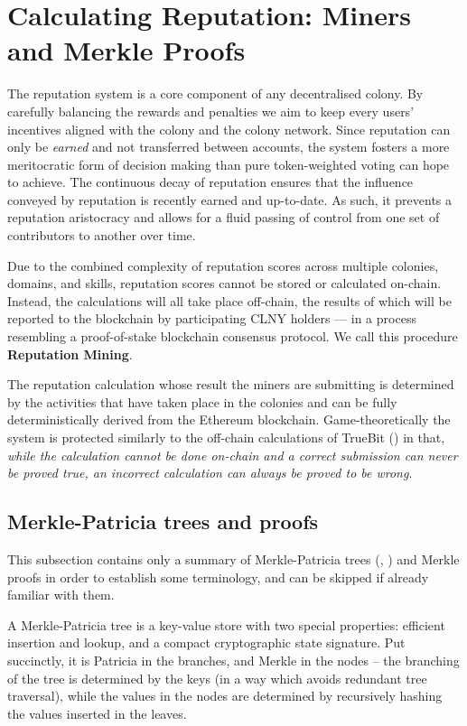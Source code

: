 
\section{Calculating Reputation: Miners and Merkle Proofs}\label{sec:reputationmining}
The reputation system is a core component of any decentralised colony. By carefully balancing the rewards and penalties we aim to keep every users' incentives aligned with the colony and the colony network. Since reputation can only be \emph{earned} and not transferred between accounts, the system fosters a more meritocratic form of decision making than pure token-weighted voting can hope to achieve. The continuous decay of reputation ensures that the influence conveyed by reputation is recently earned and up-to-date. As such, it prevents a reputation aristocracy and allows for a fluid passing of control from one set of contributors to another over time.


Due to the combined complexity of reputation scores across multiple colonies, domains, and skills, reputation scores cannot be stored or calculated on-chain. Instead, the calculations will all take place off-chain, the results of which will be reported to the blockchain by participating CLNY holders --- in a process resembling a proof-of-stake blockchain consensus protocol. We call this procedure \textbf{Reputation Mining}.

The reputation calculation whose result the miners are submitting is determined by the activities that have taken place in the colonies and can be fully deterministically derived from the Ethereum blockchain. Game-theoretically the system is protected similarly to the off-chain calculations of TrueBit (\cite{TruebitWhitepaper}) in that, \emph{while the calculation cannot be done on-chain and a correct submission can never be proved true, an incorrect calculation can always be proved to be wrong}.


\subsection{Merkle-Patricia trees and proofs}\label{sec:Merkle-summary}
This subsection contains only a summary of Merkle-Patricia trees (\cite{MerkleTrees}, \cite{MerkleInEthereum}) and Merkle proofs in order to establish some terminology, and can be skipped if already familiar with them.

A Merkle-Patricia tree is a key-value store with two special properties: efficient insertion and lookup, and a compact cryptographic state signature. Put succinctly, it is Patricia in the branches, and Merkle in the nodes -- the branching of the tree is determined by the keys (in a way which avoids redundant tree traversal), while the values in the nodes are determined by recursively hashing the values inserted in the leaves.

